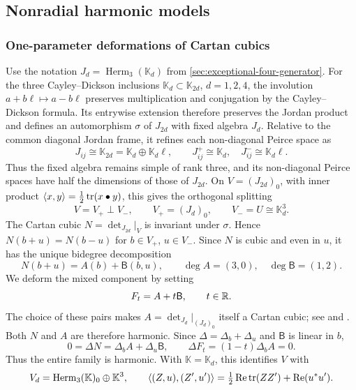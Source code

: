 \subsection{Nonradial harmonic models}
\label{sec:nonradial-models}

\subsubsection{One-parameter deformations of Cartan cubics}

Use the notation \(J_d=\operatorname{Herm}_3(\mathbb K_d)\) from
\cref{sec:exceptional-four-generator}. For the three Cayley--Dickson
inclusions \(\mathbb K_d\subset\mathbb K_{2d}\), \(d=1,2,4\), the
involution \(a+b\ell\mapsto a-b\ell\) preserves multiplication
and conjugation by the Cayley--Dickson formula. Its entrywise extension
therefore preserves the Jordan product and defines an automorphism
\(\sigma\) of \(J_{2d}\) with fixed algebra \(J_d\).
Relative to the common diagonal Jordan frame, it refines each
non-diagonal Peirce space as
\[
 J_{ij}\cong\mathbb K_{2d}
       =\mathbb K_d\oplus\mathbb K_d\ell,
 \qquad J_{ij}^{+}\cong\mathbb K_d,\quad
 J_{ij}^{-}\cong\mathbb K_d\ell.
\]
Thus the fixed algebra remains simple of rank three, and its
non-diagonal Peirce spaces have half the dimensions of those of
\(J_{2d}\).
On \(V=(J_{2d})_0\), with inner product
\(\langle x,y\rangle=\frac12\operatorname{tr}(x\bullet y)\), this gives the orthogonal splitting
\[
 V=V_+\mathbin{\perp}V_-,\qquad
 V_+=(J_d)_0,\qquad V_-=U\cong\mathbb K_d^3.
\]
The Cartan cubic \(N=\det_{J_{2d}}|_V\) is invariant under \(\sigma\).
Hence \(N(b+u)=N(b-u)\) for \(b\in V_+\), \(u\in V_-\).
Since $N$ is cubic and even in $u$, it has the unique bidegree decomposition
\[
 N(b+u)=A(b)+\mathsf B(b,u),\qquad
 \deg A=(3,0),\quad \deg\mathsf B=(1,2).
\]
We deform the mixed component by setting
\begin{equation}\label{eq:nonradial-pencil}
 F_t=A+t\mathsf B,\qquad t\in\mathbb R.
\end{equation}
The choice of these pairs makes \(A=\det_{J_d}|_{(J_d)_0}\) itself a
Cartan cubic; see \cite[Theorem~3.1.1 and
Sections~3.2.6, 6.4.4--6.4.5]{NadirashviliTkachevVladut14} and
\cite{TkachevJordan14}. Both \(N\) and \(A\) are therefore harmonic.
Since \(\Delta=\Delta_b+\Delta_u\) and \(\mathsf B\) is linear in \(b\),
\[
 0=\Delta N=\Delta_bA+\Delta_u\mathsf B,
 \qquad \Delta F_t=(1-t)\Delta_bA=0.
\]
Thus the entire family is harmonic.
With \(\mathbb K=\mathbb K_d\), this identifies \(V\) with
\[
 V_d=\operatorname{Herm}_3(\mathbb K)_0\oplus\mathbb K^3,\qquad
 \langle (Z,u),(Z',u')\rangle=\tfrac12\operatorname{Re}\operatorname{tr}(ZZ')
                         +\operatorname{Re}(u^*u').
\]
